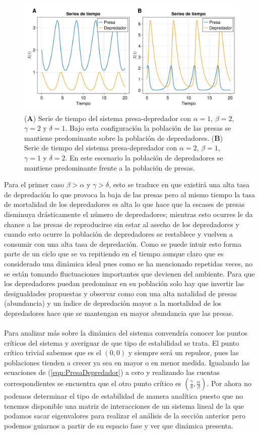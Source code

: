 \begin{figure}[h!]
	\centering
	\includegraphics[scale=0.23]{../../Imagenes/Series de Tiempo PD}
	\caption{(\textbf{A}) Serie de tiempo del sistema presa-depredador con $\alpha=1$, $\beta=2$, $\gamma=2$ y $\delta=1$. Bajo esta configuración la población de las presas se mantiene predominante sobre la población de depredadores. (\textbf{B}) Serie de tiempo del sistema presa-depredador con $\alpha=2$, $\beta = 1$, $\gamma = 1$ y $\delta = 2$. En este escenario la población de depredadores se mantiene predominante frente a la población de presas.}
	\label{fig:SeriesdeTiempoPD}
\end{figure}
Para el primer caso $\beta >\alpha$ y $\gamma>\delta$, esto se traduce en que existirá una alta tasa de depredación lo que provoca la baja de las presas pero al mismo tiempo la tasa de mortalidad de los depredadores es alta lo que hace que la escases de presas disminuya drásticamente el número de depredadores; mientras esto ocurres le da chance a las presas de reproducirse sin estar al asecho de los depredadores y cuando esto ocurre la población de depredadores se restablece y vuelven a consumir con una alta tasa de depredación. Como se puede intuir esto forma parte de un ciclo que se va repitiendo en el tiempo aunque claro que es considerado una dinámica ideal pues como se ha mencionado repetidas veces, no se están tomando fluctuaciones importantes que devienen del ambiente. Para que los depredadores puedan predominar en su población solo hay que invertir las desigualdades propuestas y observar como con una alta natalidad de presas (abundancia) y un índice de depredación mayor a la mortalidad de los depredadores hace que se mantengan en mayor abundancia que las presas.\\
\\
Para analizar más sobre la dinámica del sistema convendría conocer los puntos críticos del sistema y averiguar de que tipo de estabilidad se trata. El punto crítico trivial sabemos que es el $(0,0)$ y siempre será un repulsor, pues las poblaciones tienden a crecer ya sea en mayor o en menor medida. Igualando las ecuaciones de (\ref{eqn:PresaDepredador}) a cero y realizando las cuentas correspondientes se encuentra que el otro punto crítico es $(\frac{\gamma}{\delta},\frac{\alpha}{\beta})$. Por ahora no podemos determinar el tipo de estabilidad de manera analítica puesto que no tenemos disponible una matriz de interacciones de un sistema lineal de la que podamos sacar eigenvalores para realizar el análisis de la sección anterior pero podemos guiarnos a partir de su espacio fase y ver que dinámica presenta.

